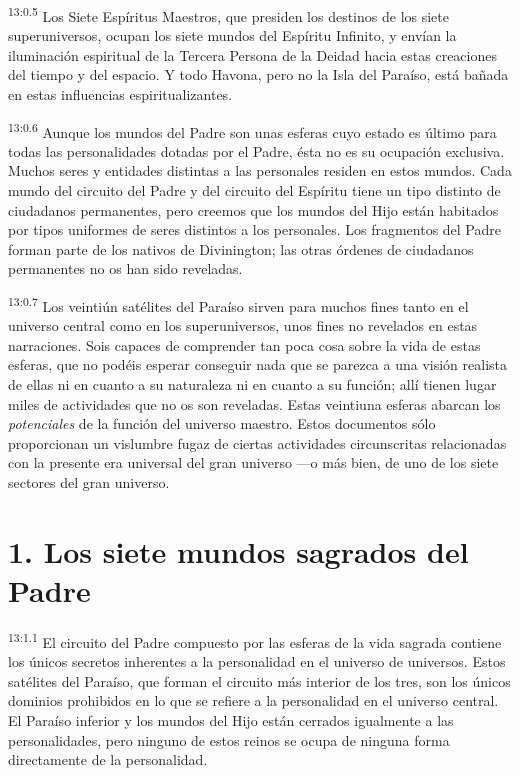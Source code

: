 \par
\textsuperscript{13:0.5} Los Siete Espíritus Maestros, que presiden los destinos de los siete superuniversos, ocupan los siete mundos del Espíritu Infinito, y envían la iluminación espiritual de la Tercera Persona de la Deidad hacia estas creaciones del tiempo y del espacio. Y todo Havona, pero no la Isla del Paraíso, está bañada en estas influencias espiritualizantes.

\par
\textsuperscript{13:0.6} Aunque los mundos del Padre son unas esferas cuyo estado es último para todas las personalidades dotadas por el Padre, ésta no es su ocupación exclusiva. Muchos seres y entidades distintas a las personales residen en estos mundos. Cada mundo del circuito del Padre y del circuito del Espíritu tiene un tipo distinto de ciudadanos permanentes, pero creemos que los mundos del Hijo están habitados por tipos uniformes de seres distintos a los personales. Los fragmentos del Padre forman parte de los nativos de Divinington; las otras órdenes de ciudadanos permanentes no os han sido reveladas.

\par
\textsuperscript{13:0.7} Los veintiún satélites del Paraíso sirven para muchos fines tanto en el universo central como en los superuniversos, unos fines no revelados en estas narraciones. Sois capaces de comprender tan poca cosa sobre la vida de estas esferas, que no podéis esperar conseguir nada que se parezca a una visión realista de ellas ni en cuanto a su naturaleza ni en cuanto a su función; allí tienen lugar miles de actividades que no os son reveladas. Estas veintiuna esferas abarcan los \textit{potenciales} de la función del universo maestro. Estos documentos sólo proporcionan un vislumbre fugaz de ciertas actividades circunscritas relacionadas con la presente era universal del gran universo ---o más bien, de uno de los siete sectores del gran universo.

\section*{1. Los siete mundos sagrados del Padre}
\par
\textsuperscript{13:1.1} El circuito del Padre compuesto por las esferas de la vida sagrada contiene los únicos secretos inherentes a la personalidad en el universo de universos. Estos satélites del Paraíso, que forman el circuito más interior de los tres, son los únicos dominios prohibidos en lo que se refiere a la personalidad en el universo central. El Paraíso inferior y los mundos del Hijo están cerrados igualmente a las personalidades, pero ninguno de estos reinos se ocupa de ninguna forma directamente de la personalidad.

